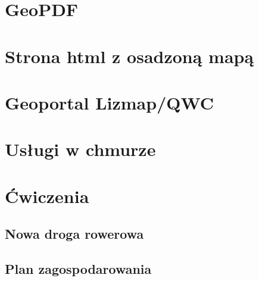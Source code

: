 \documentclass[a4paper,11pt, onecolumn, openany]{memoir}
\begin{document}
\section{GeoPDF}
\section{Strona html z osadzoną mapą}
\section{Geoportal Lizmap/QWC}
\section{Usługi w chmurze}
\section{Ćwiczenia}
\subsection{Nowa droga rowerowa}
\subsection{Plan zagospodarowania}
\backmatter

\tableofcontents*
\clearpage



\end{document}
